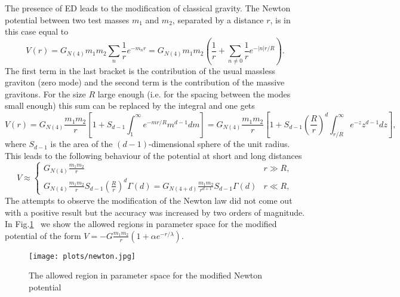 \documentclass{cernyrep}
\begin{document}
The presence of ED leads to the modification of classical gravity.
The Newton potential between two test masses $m_{1}$ and $m_{2}$,
separated by a distance $r$, is in this case equal to
\[
V(r) = G_{N(4)} m_{1}m_{2} \sum_{n} \frac{1}{r} e^{-m_{n}r} =
G_{N(4)} m_{1}m_{2} \left( \frac{1}{r} +
   \sum_{n \neq 0} \frac{1}{r} e^{-|n|r/R}  \right).
\]
The first term in the last bracket is the contribution of the
usual massless graviton (zero mode) and the second term is the
contribution of the massive gravitons. For the size $R$ large
enough (i.e. for the spacing between the modes small enough) this
sum can be replaced by the integral and one gets \cite{ADD}
\begin{equation}
  V(r)  =   G_{N(4)} \frac{m_{1}m_{2}}{r} \left[
1\! + \!S_{d-1} \int_{1}^{\infty}\!\! \!\!\!e^{-mr/R} m^{d-1} dm \right]%
    =   G_{N(4)} \frac{m_{1}m_{2}}{r} \left[
1\! +\! S_{d-1} \left( \frac{R}{r} \right)^{d} \int_{r/R}^{\infty}\!\! \!\!\!
e^{-z} z^{d-1} dz \right], \label{Npot}
\end{equation}
 where $S_{d-1}$ is the area of the $(d-1)$-dimensional sphere
 of the unit radius. This leads to the following
behaviour of the potential at short and long distances
\begin{equation}\label{pot}
  V\approx \left\{ \begin{array}{ll} G_{N(4)} \frac{\displaystyle m_{1}
  m_{2}}{\displaystyle r}& r \gg R,\\
G_{N(4)} \frac{\displaystyle m_{1} m_{2}}{\displaystyle r} S_{d-1}
     \left( \frac{\displaystyle R}{\displaystyle r} \right)^{d} \Gamma (d) =
     G_{N(4+d)} \frac{\displaystyle m_{1} m_{2}}{\displaystyle r^{d+1}}
      S_{d-1} \Gamma (d) & r \ll R,
     \end{array} \right.
\end{equation}
The attempts to observe the modification of the Newton law did not come out with a positive result but the accuracy was increased by two orders of magnitude. In Fig.\ref{newforce}~\cite{newton} we show the 
allowed regions in parameter space for the modified potential of the  form $V=-G\frac{m_1m_2}{r}(1+\alpha e^{-r/\lambda})$.
\begin{figure}[htb]
\begin{center}
\leavevmode
\texttt{[image: plots/newton.jpg]}
\end{center}\caption{The allowed region in parameter space  for the modified Newton potential}
\label{newforce}
\end{figure}
\end{document}
